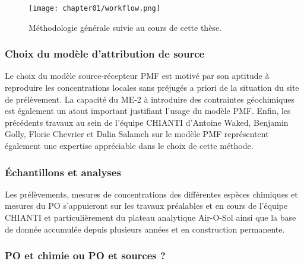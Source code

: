 \begin{figure}[ht]
    \centering
    \texttt{[image: chapter01/workflow.png]}
    \caption{Méthodologie générale suivie au cours de cette thèse.}%
    \label{fig:chapter01/workflow}
\end{figure}


\subsubsection{Choix du modèle d'attribution de source}%
\label{ssub:choix_du_modèle_d_attribution_de_source}

Le choix du modèle source-récepteur PMF est motivé par son aptitude à reproduire les
concentrations locales sans préjugés a priori de la situation du site de prélèvement. La
capacité du ME-2 à introduire des contraintes géochimiques est également un atout
important justifiant l'usage du modèle PMF.
Enfin, les précédents travaux au sein de l'équipe CHIANTI d'Antoine Waked, Benjamin Golly,
Florie Chevrier et Dalia Salameh sur le modèle PMF représentent également une expertise
appréciable dans le choix de cette méthode.

\subsubsection{Échantillons et analyses}%
\label{ssub:échantillons_et_analyses}

Les prélèvements, mesures de concentrations des différentes espèces chimiques et
mesures du PO s'appuieront sur les travaux préalables et en cours de l'équipe CHIANTI et
particulièrement du plateau analytique Air-O-Sol ainsi que la base de donnée accumulée
depuis plusieurs années et en construction permanente.

\subsubsection{PO et chimie ou PO et sources ?}%
\label{ssub:chimie_ou_sources_}

